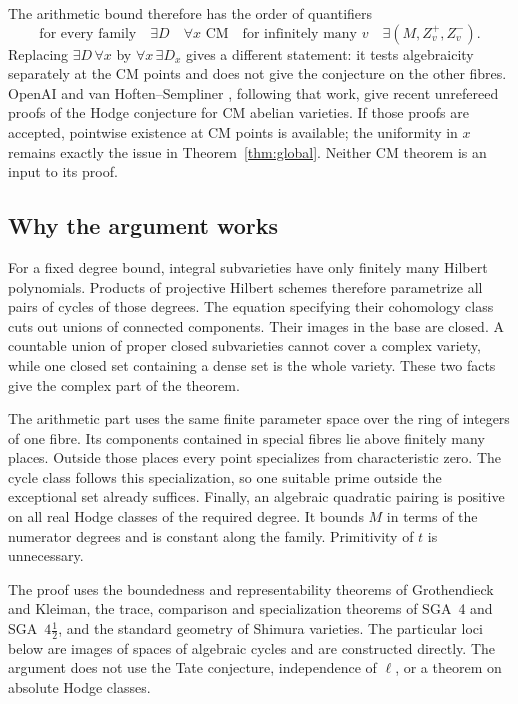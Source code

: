 \documentclass[11pt]{article}
\theoremstyle{definition}
\theoremstyle{remark}
\begin{document}
The arithmetic bound therefore has the order of quantifiers
\[
 \text{for every family}\quad\exists D\quad\forall x\text{ CM}
 \quad\text{for infinitely many }v\quad\exists(M,Z_v^+,Z_v^-).
\]
Replacing $\exists D\,\forall x$ by $\forall x\,\exists D_x$ gives a different statement: it tests algebraicity separately at the CM points and does not give the conjecture on the other fibres. OpenAI \cite[Theorem~1.1]{OpenAICM} and van Hoften--Sempliner \cite[Theorem~I]{vHS}, following that work, give recent unrefereed proofs of the Hodge conjecture for CM abelian varieties. If those proofs are accepted, pointwise existence at CM points is available; the uniformity in $x$ remains exactly the issue in Theorem~\ref{thm:global}. Neither CM theorem is an input to its proof.

\subsection{Why the argument works}

For a fixed degree bound, integral subvarieties have only finitely many Hilbert polynomials. Products of projective Hilbert schemes therefore parametrize all pairs of cycles of those degrees. The equation specifying their cohomology class cuts out unions of connected components. Their images in the base are closed. A countable union of proper closed subvarieties cannot cover a complex variety, while one closed set containing a dense set is the whole variety. These two facts give the complex part of the theorem.

The arithmetic part uses the same finite parameter space over the ring of integers of one fibre. Its components contained in special fibres lie above finitely many places. Outside those places every point specializes from characteristic zero. The cycle class follows this specialization, so one suitable prime outside the exceptional set already suffices. Finally, an algebraic quadratic pairing is positive on all real Hodge classes of the required degree. It bounds $M$ in terms of the numerator degrees and is constant along the family. Primitivity of $t$ is unnecessary.

The proof uses the boundedness and representability theorems of Grothendieck and Kleiman, the trace, comparison and specialization theorems of SGA~4 and SGA~$4\frac12$, and the standard geometry of Shimura varieties. The particular loci below are images of spaces of algebraic cycles and are constructed directly. The argument does not use the Tate conjecture, independence of $\ell$, or a theorem on absolute Hodge classes.
\end{document}
